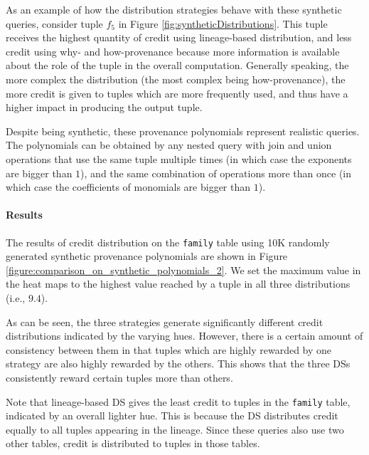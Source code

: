 As an example of how the distribution strategies behave with these synthetic queries, consider tuple $f_5$ in Figure \ref{fig:syntheticDistributions}.
This tuple receives the highest quantity of credit using lineage-based distribution, and less credit using why- and how-provenance because more information is available about the role of the tuple in the overall computation. 
Generally speaking, the more complex the distribution (the most complex being how-provenance), the more credit is given to tuples which are more frequently used, and thus have a higher impact in producing the output tuple. 

Despite being synthetic, these provenance polynomials represent realistic queries.  The polynomials can be obtained by any nested query with join and union operations that use the same tuple multiple times (in which case the exponents are bigger than $1$), and the same combination of operations more than once (in which case the coefficients of monomials are bigger than $1$). 

\paragraph{Results} The results of credit distribution on the \texttt{family} table using 10K randomly generated synthetic provenance polynomials are shown in
Figure \ref{figure:comparison_on_synthetic_polynomials_2}. 
We set the maximum value in the heat maps to the highest value reached by a tuple in all three distributions (i.e., $9.4$). 

As can be seen, the three strategies generate significantly different credit distributions indicated by the varying hues. 
However, there is a certain amount of consistency between them in that tuples which are highly rewarded by one strategy are also highly rewarded by the others. This shows that the three DSs consistently reward certain tuples more than others. 

Note that lineage-based DS gives the least credit to tuples in the \texttt{family} table, indicated by an overall lighter hue. This is because the DS  distributes credit equally to all tuples appearing in the lineage. Since these queries also use two other tables, credit is distributed to tuples in those tables.

